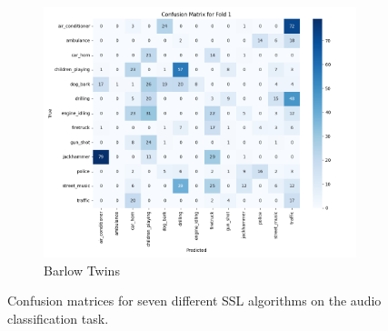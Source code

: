 \documentclass[11pt]{article}
\begin{document}
\begin{figure}[ht]
    \hfill
    \begin{subfigure}[b]{0.24\textwidth}
        \centering
        \includegraphics[width=\textwidth]{latex/assets/1-fold-1-epoch/confusion_matrix_barlow.png}
        \caption{Barlow Twins}
        \label{fig:cm_barlow}
    \end{subfigure}
    
    \caption{Confusion matrices for seven different SSL algorithms on the audio classification task.}
    \label{fig:all_confusion_matrices}
\end{figure}
\end{document}
